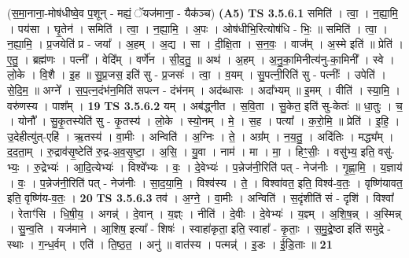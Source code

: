 \documentclass[17pt]{extarticle}
\begin{document}
                  \newline
                      (स॒मा॒नाना॒-मोष॑धीष्वे॒व प॒शून् - मह्यं॒ ॅयज॑माना॒ - यैक॑ञ्च)  \textbf{(A5)} \newline \newline
                                \textbf{ TS 3.5.6.1} \newline
                  समिति॑ । त्वा॒ । न॒ह्या॒मि॒ । पय॑सा । घृ॒तेन॑ । समिति॑ । त्वा॒ । न॒ह्या॒मि॒ । अ॒पः । ओष॑धीभि॒रित्योष॑धि - भिः॒ ॥ समिति॑ । त्वा॒ । न॒ह्या॒मि॒ । प्र॒जयेति॑ प्र - जया᳚ । अ॒हम् । अ॒द्य । सा । दी॒क्षि॒ता । स॒न॒वः॒ । वाज᳚म् । अ॒स्मे इति॑ ॥ प्रेति॑ । ए॒तु॒ । ब्रह्म॑णः । पत्नी᳚ । वेदि᳚म् । वर्णे॑न । सी॒द॒तु॒ ॥ अथ॑ । अ॒हम् । अ॒नु॒का॒मिनीत्य॑नु-का॒मिनी᳚ । स्वे । लो॒के । वि॒शै । इ॒ह ॥ सु॒प्र॒जस॒ इति॑ सु - प्र॒जसः॑ । त्वा॒ । व॒यम् । सु॒पत्नी॒रिति॑ सु - पत्नीः᳚ । उपेति॑ । से॒दि॒म॒ ॥ अग्ने᳚ । स॒प॒त्न॒दंभ॑न॒मिति॑ सपत्न - दंभ॑नम् । अद॑ब्धासः । अदा᳚भ्यम् ॥ इ॒मम् । वीति॑ । स्या॒मि॒ । वरु॑णस्य । पाश᳚म् । \textbf{  19} \newline
                  \newline
                                \textbf{ TS 3.5.6.2} \newline
                  यम् । अब॑द्ध्नीत । स॒वि॒ता । सु॒केत॒ इति॑ सु-केतः॑ ॥ धा॒तुः । च॒ । योनौ᳚ । सु॒कृ॒तस्येति॑ सु - कृ॒तस्य॑ । लो॒के । स्यो॒नम् । मे॒ । स॒ह । पत्या᳚ । क॒रो॒मि॒ ॥ प्रेति॑ । इ॒हि॒ । उ॒देहीत्यु॑त्-एहि॑ । ऋ॒तस्य॑ । वा॒मीः । अन्विति॑ । अ॒ग्निः । ते॒ । अग्र᳚म् । न॒य॒तु॒ । अदि॑तिः । मद्ध्य᳚म् । द॒द॒ता॒म् । रु॒द्राव॑सृ॒ष्टेति॑ रु॒द्र-अ॒व॒सृ॒ष्टा॒ । अ॒सि॒ । यु॒वा । नाम॑ । मा । मा॒ । हिꣳ॒॒सीः॒ । वसु॑भ्य॒ इति॒ वसु॑-भ्यः॒ । रु॒द्रेभ्यः॑ । आ॒दि॒त्येभ्यः॑ । विश्वे᳚भ्यः । वः॒ । दे॒वेभ्यः॑ । प॒न्नेज॑नी॒रिति॑ पत् - नेज॑नीः । गृ॒ह्णा॒मि॒ । य॒ज्ञाय॑ । वः॒ । प॒न्नेज॑नी॒रिति॑ पत् - नेज॑नीः । सा॒द॒या॒मि॒ । विश्व॑स्य । ते॒ । विश्वा॑वत॒ इति॒ विश्व॑-व॒तः॒ । वृष्णि॑यावत॒ इति॒ वृष्णि॑य-व॒तः॒ । \textbf{  20} \newline
                  \newline
                                \textbf{ TS 3.5.6.3} \newline
                  तव॑ । अ॒ग्ने॒ । वा॒मीः । अन्विति॑ । स॒दृंशीति॑ सं - दृशि॑ । विश्वा᳚ । रेताꣳ॑सि । धि॒षी॒य॒ । अगन्न्॑ । दे॒वान् । य॒ज्ञ्ः । नीति॑ । दे॒वीः । दे॒वेभ्यः॑ । य॒ज्ञ्म् । अ॒शि॒ष॒न्न् । अ॒स्मिन्न् । सु॒न्व॒ति । यज॑माने । आ॒शिष॒ इत्या᳚ - शिषः॑ । स्वाहा॑कृता॒ इति॒ स्वाहा᳚ - कृ॒ताः॒ । स॒मु॒द्रे॒ष्ठा इति॑ समुद्रे - स्थाः । ग॒न्ध॒र्वम् । एति॑ । ति॒ष्ठ॒त॒ । अनु॑ ॥ वात॑स्य । पत्मन्न्॑ । इ॒डः । ई॒डि॒ताः ॥ \textbf{  21 } \newline
\end{document}
